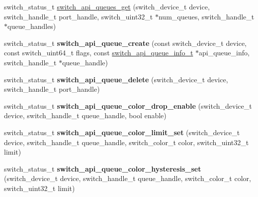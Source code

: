 \begin{DoxyCompactItemize}
\item 
switch\+\_\+status\+\_\+t \hyperlink{group__QUEUE_gaa6a8c84353933c15bbe2bae22c8937ff}{switch\+\_\+api\+\_\+queues\+\_\+get} (switch\+\_\+device\+\_\+t device, switch\+\_\+handle\+\_\+t port\+\_\+handle, switch\+\_\+uint32\+\_\+t $\ast$num\+\_\+queues, switch\+\_\+handle\+\_\+t $\ast$queue\+\_\+handles)
\item 
\hypertarget{group__QUEUE_gae00b23e373e8afa53fae9e34c890c801}{switch\+\_\+status\+\_\+t {\bfseries switch\+\_\+api\+\_\+queue\+\_\+create} (const switch\+\_\+device\+\_\+t device, const switch\+\_\+uint64\+\_\+t flags, const \hyperlink{structswitch__api__queue__info__s}{switch\+\_\+api\+\_\+queue\+\_\+info\+\_\+t} $\ast$api\+\_\+queue\+\_\+info, switch\+\_\+handle\+\_\+t $\ast$queue\+\_\+handle)}\label{group__QUEUE_gae00b23e373e8afa53fae9e34c890c801}

\item 
\hypertarget{group__QUEUE_gac8560b068017596fe8e6535933b5175a}{switch\+\_\+status\+\_\+t {\bfseries switch\+\_\+api\+\_\+queue\+\_\+delete} (switch\+\_\+device\+\_\+t device, switch\+\_\+handle\+\_\+t port\+\_\+handle)}\label{group__QUEUE_gac8560b068017596fe8e6535933b5175a}

\item 
\hypertarget{group__QUEUE_ga3991ab02ba1a6e22d6337b4de8eae354}{switch\+\_\+status\+\_\+t {\bfseries switch\+\_\+api\+\_\+queue\+\_\+color\+\_\+drop\+\_\+enable} (switch\+\_\+device\+\_\+t device, switch\+\_\+handle\+\_\+t queue\+\_\+handle, bool enable)}\label{group__QUEUE_ga3991ab02ba1a6e22d6337b4de8eae354}

\item 
\hypertarget{group__QUEUE_gabd931e79a1b3190ea5f51899dc008e8f}{switch\+\_\+status\+\_\+t {\bfseries switch\+\_\+api\+\_\+queue\+\_\+color\+\_\+limit\+\_\+set} (switch\+\_\+device\+\_\+t device, switch\+\_\+handle\+\_\+t queue\+\_\+handle, switch\+\_\+color\+\_\+t color, switch\+\_\+uint32\+\_\+t limit)}\label{group__QUEUE_gabd931e79a1b3190ea5f51899dc008e8f}

\item 
\hypertarget{group__QUEUE_ga2d4aa58b44074bbf4d89ccc5aaba2681}{switch\+\_\+status\+\_\+t {\bfseries switch\+\_\+api\+\_\+queue\+\_\+color\+\_\+hysteresis\+\_\+set} (switch\+\_\+device\+\_\+t device, switch\+\_\+handle\+\_\+t queue\+\_\+handle, switch\+\_\+color\+\_\+t color, switch\+\_\+uint32\+\_\+t limit)}\label{group__QUEUE_ga2d4aa58b44074bbf4d89ccc5aaba2681}


\end{DoxyCompactItemize}
